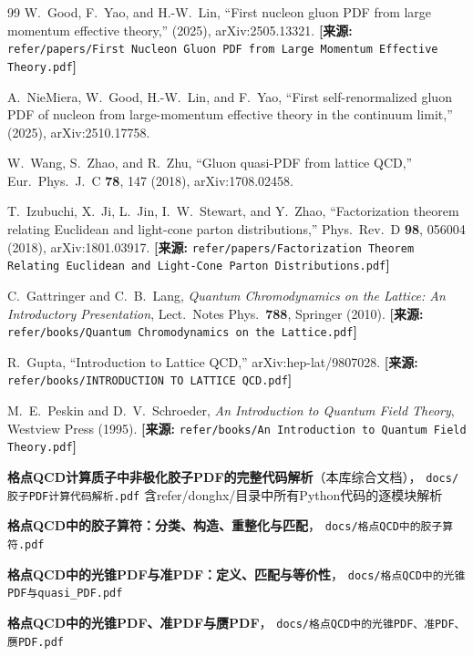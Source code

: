 \documentclass[12pt,a4paper]{ctexart}
\theoremstyle{definition}
\begin{document}
\begin{thebibliography}{99}
W.~Good, F.~Yao, and H.-W.~Lin,
``First nucleon gluon PDF from large momentum effective theory,''
(2025), arXiv:2505.13321.
\quad\textbf{[来源:} \texttt{refer/papers/First Nucleon Gluon PDF from Large Momentum Effective Theory.pdf}\textbf{]}

A.~NieMiera, W.~Good, H.-W.~Lin, and F.~Yao,
``First self-renormalized gluon PDF of nucleon from large-momentum effective theory in the continuum limit,''
(2025), arXiv:2510.17758.

W.~Wang, S.~Zhao, and R.~Zhu,
``Gluon quasi-PDF from lattice QCD,''
Eur.\ Phys.\ J.\ C \textbf{78}, 147 (2018), arXiv:1708.02458.

T.~Izubuchi, X.~Ji, L.~Jin, I.~W.~Stewart, and Y.~Zhao,
``Factorization theorem relating Euclidean and light-cone parton distributions,''
Phys.\ Rev.\ D \textbf{98}, 056004 (2018), arXiv:1801.03917.
\quad\textbf{[来源:} \texttt{refer/papers/Factorization Theorem Relating Euclidean and Light-Cone Parton Distributions.pdf}\textbf{]}

C.~Gattringer and C.~B.~Lang,
\textit{Quantum Chromodynamics on the Lattice: An Introductory Presentation},
Lect.\ Notes Phys.\ \textbf{788}, Springer (2010).
\quad\textbf{[来源:} \texttt{refer/books/Quantum Chromodynamics on the Lattice.pdf}\textbf{]}

R.~Gupta,
``Introduction to Lattice QCD,''
arXiv:hep-lat/9807028.
\quad\textbf{[来源:} \texttt{refer/books/INTRODUCTION TO LATTICE QCD.pdf}\textbf{]}

M.~E.~Peskin and D.~V.~Schroeder,
\textit{An Introduction to Quantum Field Theory},
Westview Press (1995).
\quad\textbf{[来源:} \texttt{refer/books/An Introduction to Quantum Field Theory.pdf}\textbf{]}

\textbf{格点QCD计算质子中非极化胶子PDF的完整代码解析}（本库综合文档），
\texttt{docs/胶子PDF计算代码解析.pdf}
\quad 含refer/donghx/目录中所有Python代码的逐模块解析

\textbf{格点QCD中的胶子算符：分类、构造、重整化与匹配}，
\texttt{docs/格点QCD中的胶子算符.pdf}

\textbf{格点QCD中的光锥PDF与准PDF：定义、匹配与等价性}，
\texttt{docs/格点QCD中的光锥PDF与quasi\_PDF.pdf}

\textbf{格点QCD中的光锥PDF、准PDF与赝PDF}，
\texttt{docs/格点QCD中的光锥PDF、准PDF、赝PDF.pdf}


\end{thebibliography}
\end{document}
